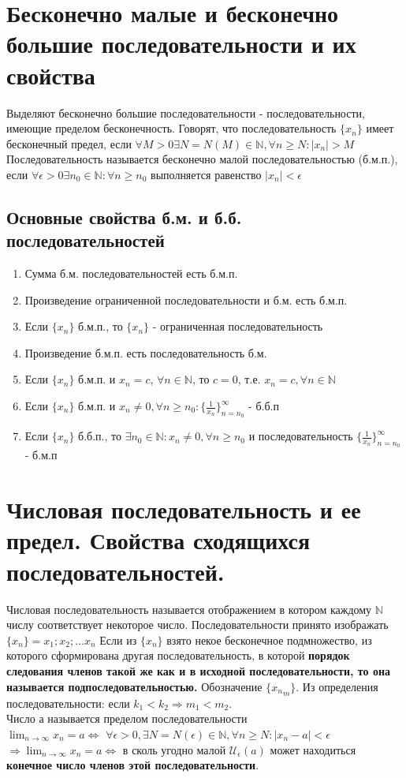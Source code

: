 \documentclass[oneside]{book}
\begin{document}
\begin{enumerate}
\chapter{Бесконечно малые и бесконечно большие последовательности и их свойства}
Выделяют бесконечно большие последовательности - последовательности, имеющие пределом бесконечность.
Говорят, что последовательность $\{x_n\}$ имеет бесконечный предел, если $\forall M>0 \exists N=N(M)\in\mathbb{N}, \forall n \geq N : |x_n|>M$
Последовательность называется бесконечно малой последовательностью (б.м.п.), если $\forall \epsilon > 0 \exists n_0 \in \mathbb{N}: \forall n\geq n_0$ выполняется равенство $ |x_n|<\epsilon$
\section{Основные свойства б.м. и б.б. последовательностей}
\begin{enumerate}
\item Сумма б.м. последовательностей есть б.м.п.
\item Произведение ограниченной последовательности и б.м. есть б.м.п.
\item Если $\{x_n\}$ б.м.п., то $\{x_n\}$ - ограниченная последовательность
\item Произведение б.м.п. есть последовательность б.м.
\item Если $\{x_n\}$ б.м.п. и $x_n = c$, $\forall n \in \mathbb{N}$, то $c=0$, т.е. $x_n = c,  \forall n \in
\mathbb{N}$
\item Если $\{x_n\}$ б.м.п. и $x_n \neq 0,  \forall n\geq n_0: \{\frac{1}{x_n}\}^\infty_{n=n_0}$ - б.б.п
\item Если $\{x_n\}$ б.б.п., то $\exists n_0 \in \mathbb{N}:x_n \neq 0,  \forall n\geq n_0$ и последовательность $ \{\frac{1}{x_n}\}^\infty_{n=n_0}$ - б.м.п
\end{enumerate}

\chapter[Последовательности]{Числовая последовательность и ее предел. Свойства сходящихся последовательностей.}
Числовая последовательность называется отображением в котором каждому $\mathbb{N}$ числу соответствует
некоторое число. Последовательности принято изображать $\{x_n\} = x_1; x_2; \dots x_n$
Если из $\{x_n\}$ взято некое бесконечное подмножество, из которого сформирована другая последовательность,
в которой \textbf{порядок следования членов такой же как и в исходной последовательности, то она
называется подпоследовательностью.} Обозначение $\{{x_n}_m\}$.
Из определения последовательности: если $k_1 < k_2 \Rightarrow m_1 < m_2$.\\
Число а называется пределом последовательности \\ $\lim_{n \rightarrow \infty}{x_n = a} \Leftrightarrow$
$\forall\epsilon>0,  \exists N=N(\epsilon) \in \mathbb{N}, \forall n \geq N: |x_n - a| < \epsilon$
$\Rightarrow \lim_{n \rightarrow \infty}{x_n = a} \Leftrightarrow$ в сколь угодно малой $\mathcal{U}_\epsilon(a)$
может находиться \textbf{конечное число членов этой последовательности}.


\end{enumerate}
\end{document}
